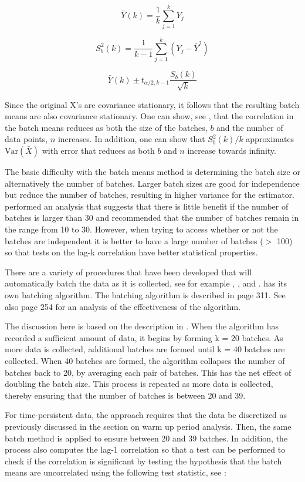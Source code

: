 \documentclass[
]{book}
\theoremstyle{definition}
\theoremstyle{definition}
\theoremstyle{definition}
\theoremstyle{definition}
\theoremstyle{remark}
\begin{document}
\[\bar{Y}(k) = \dfrac{1}{k} \sum_{j=1}^k Y_j\]

\[S_b^2 (k) = \dfrac{1}{k - 1} \sum_{j=1}^k (Y_j - \bar{Y}^2)\]

\[\bar{Y}(k) \pm t_{\alpha/2, k-1} \dfrac{S_b (k)}{\sqrt{k}}\]

Since the original X's are covariance stationary, it follows that the
resulting batch means are also covariance stationary. One can show, see
\citep{alexopoulos1998output}, that the correlation in the batch means
reduces as both the size of the batches, \(b\) and the number of data
points, \(n\) increases. In addition, one can show that \(S_b^2 (k)/k\)
approximates \(\text{Var}(\bar{X})\) with error that reduces as both \(b\)
and \(n\) increase towards infinity.

The basic difficulty with the batch means method is determining the
batch size or alternatively the number of batches. Larger batch sizes
are good for independence but reduce the number of batches, resulting in
higher variance for the estimator. \citep{schmeiser1982batch} performed an
analysis that suggests that there is little benefit if the number of
batches is larger than 30 and recommended that the number of batches
remain in the range from 10 to 30. However, when trying to access
whether or not the batches are independent it is better to have a large
number of batches (\(>\) 100) so that tests on the lag-k correlation have
better statistical properties.

There are a variety of procedures that have been developed that will
automatically batch the data as it is collected, see for example
\citep{fishman1997an}, \citep{steiger2002an}, and \citet{banks2005discreteevent}. has its
own batching algorithm. The batching algorithm is described in
\citet{kelton2004simulation} page 311. See also \citep{fishman2001discreteevent}
page 254 for an analysis of the effectiveness of the algorithm.

The discussion here is based on the description in
\citet{kelton2004simulation}. When the algorithm has recorded a sufficient
amount of data, it begins by forming k = 20 batches. As more data is
collected, additional batches are formed until k = 40 batches are
collected. When 40 batches are formed, the algorithm collapses the
number of batches back to 20, by averaging each pair of batches. This
has the net effect of doubling the batch size. This process is repeated
as more data is collected, thereby ensuring that the number of batches
is between 20 and 39.

For time-persistent data, the approach requires that the data be
discretized as previously discussed in the section on warm up period
analysis. Then, the same batch method is applied to ensure between 20
and 39 batches. In addition, the process also computes the lag-1
correlation so that a test can be performed to check if the correlation
is significant by testing the hypothesis that the batch means are
uncorrelated using the following test statistic, see
\citep{alexopoulos1998output}:
\end{document}
